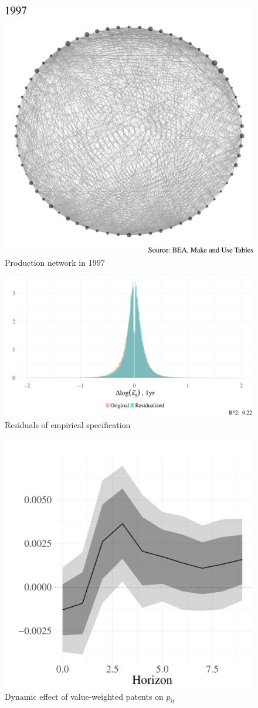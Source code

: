 \documentclass[11pt]{article}
\begin{document}
\begin{figure}[!h]
\centering
\includegraphics[width=.65\textwidth]{../figures/digraphs/A_summary_1997.pdf}
\caption{Production network in 1997}
\label{fig:PN1997}
\end{figure}

\begin{figure}
\centering
\includegraphics[width=.75\textwidth]{../figures/histograms/resid_hist.pdf}
\caption{Residuals of empirical specification}
\label{fig:reg_resid}
\end{figure}

\begin{figure}
\centering 
\includegraphics[width=.75\textwidth]{../figures/local_projections/patents_value_resid.pdf}
\caption{Dynamic effect of value-weighted patents on $p_{it}$}
\label{fig:patents_value_resid}
\end{figure}
\end{document}
